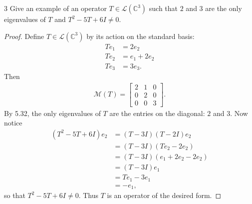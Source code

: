 \documentclass{extarticle}
\newenvironment{problem}[1]{\begin{prob*}{#1}{}}{\end{prob*}}
\newcommand{\C}{\mathbb{C}}
\newcommand{\mat}{\mathcal{M}}
\newcommand{\Hom}{\mathcal{L}}
\begin{document}
\begin{problem}{3}
Give an example of an operator $T\in\Hom(\C^3)$ such that $2$ and $3$ are the only eigenvalues of $T$ and $T^2 - 5T + 6I \neq 0$.
\end{problem}
\begin{proof}
Define $T\in\Hom(\C^3)$ by its action on the standard basis:
\begin{align*}
Te_1 &= 2e_2\\
Te_2 &= e_1 + 2e_2\\
Te_3 &= 3e_3.
\end{align*}
Then 
\begin{align*}
\mat(T) = \begin{bmatrix}2 & 1 & 0\\ 0 & 2 & 0\\ 0 & 0 & 3\end{bmatrix}.
\end{align*}
By 5.32, the only eigenvalues of $T$ are the entries on the diagonal: $2$ and $3$.  Now notice
\begin{align*}
(T^2 - 5T + 6I)e_2 &= (T - 3I)(T - 2I)e_2\\
&= (T - 3I)(Te_2 - 2e_2)\\
&= (T - 3I)(e_1 + 2e_2 - 2e_2)\\
&= (T - 3I)e_1\\
&= Te_1 - 3e_1\\
&= -e_1,
\end{align*}
so that $T^2 - 5T + 6I\neq 0$.  Thus $T$ is an operator of the desired form.
\end{proof}
\end{document}
